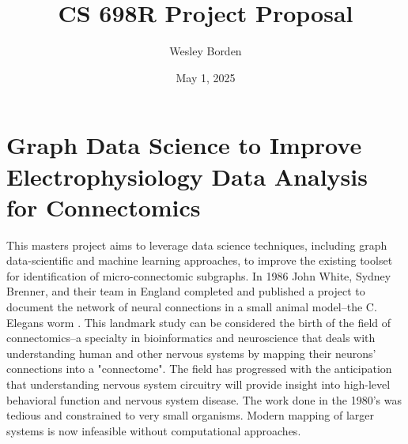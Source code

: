 \documentclass[11pt]{article}
\title{CS 698R Project Proposal}
\author{Wesley Borden}
\date{May 1, 2025}
\newcommand{\sectionwithindent}[1]{%
    \section*{#1}%
    \hspace{\parindent} %
}
\begin{document}

\sectionwithindent{Graph Data Science to Improve Electrophysiology Data Analysis for Connectomics}
This masters project aims to leverage data science techniques, including graph data-scientific and machine learning approaches, to improve the existing toolset for identification of micro-connectomic subgraphs. In 1986 John White, Sydney Brenner, and their team in England completed and published a project to document the network of neural connections in a small animal model--the C. Elegans worm \cite{white1986structure, emmons2015connectomics}. This landmark study can be considered the birth of the field of connectomics--a specialty in bioinformatics and neuroscience that deals with understanding human and other nervous systems by mapping their neurons' connections into a "connectome". The field has progressed with the anticipation that understanding nervous system circuitry will provide insight into high-level behavioral function and nervous system disease. The work done in the 1980's was tedious and constrained to very small organisms. Modern mapping of larger systems is now infeasible without computational approaches.
\end{document}
